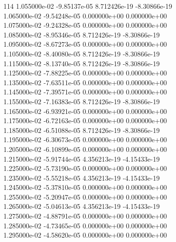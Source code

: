114	1.055000e-02	-9.85137e-05	8.712426e-19	-8.30866e-19	\\ 	1.065000e-02	-9.54248e-05	0.000000e+00	0.000000e+00	\\ 	1.075000e-02	-9.24328e-05	0.000000e+00	0.000000e+00	\\ 	1.085000e-02	-8.95346e-05	8.712426e-19	-8.30866e-19	\\ 	1.095000e-02	-8.67273e-05	0.000000e+00	0.000000e+00	\\ 	1.105000e-02	-8.40080e-05	8.712426e-19	-8.30866e-19	\\ 	1.115000e-02	-8.13740e-05	8.712426e-19	-8.30866e-19	\\ 	1.125000e-02	-7.88225e-05	0.000000e+00	0.000000e+00	\\ 	1.135000e-02	-7.63511e-05	0.000000e+00	0.000000e+00	\\ 	1.145000e-02	-7.39571e-05	0.000000e+00	0.000000e+00	\\ 	1.155000e-02	-7.16383e-05	8.712426e-19	-8.30866e-19	\\ 	1.165000e-02	-6.93921e-05	0.000000e+00	0.000000e+00	\\ 	1.175000e-02	-6.72163e-05	0.000000e+00	0.000000e+00	\\ 	1.185000e-02	-6.51088e-05	8.712426e-19	-8.30866e-19	\\ 	1.195000e-02	-6.30673e-05	0.000000e+00	0.000000e+00	\\ 	1.205000e-02	-6.10899e-05	0.000000e+00	0.000000e+00	\\ 	1.215000e-02	-5.91744e-05	4.356213e-19	-4.15433e-19	\\ 	1.225000e-02	-5.73190e-05	0.000000e+00	0.000000e+00	\\ 	1.235000e-02	-5.55218e-05	4.356213e-19	-4.15433e-19	\\ 	1.245000e-02	-5.37810e-05	0.000000e+00	0.000000e+00	\\ 	1.255000e-02	-5.20947e-05	0.000000e+00	0.000000e+00	\\ 	1.265000e-02	-5.04613e-05	4.356213e-19	-4.15433e-19	\\ 	1.275000e-02	-4.88791e-05	0.000000e+00	0.000000e+00	\\ 	1.285000e-02	-4.73465e-05	0.000000e+00	0.000000e+00	\\ 	1.295000e-02	-4.58620e-05	0.000000e+00	0.000000e+00	\\ \hline
